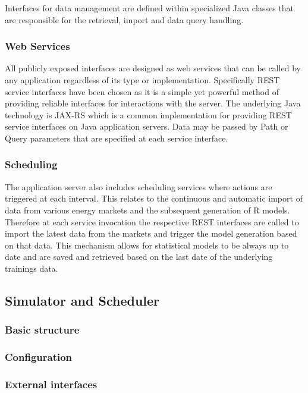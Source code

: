 Interfaces for data management are defined within specialized Java classes that are responsible for the retrieval, import and data query handling. 

\subsubsection{Web Services}

All publicly exposed interfaces are designed as web services that can be called by any application regardless of its type or implementation. Specifically REST service interfaces have been chosen as it is a simple yet powerful method of providing reliable interfaces for interactions with the server. The underlying Java technology is JAX-RS which is a common implementation for providing REST service interfaces on Java application servers. Data may be passed by Path or Query parameters that are specified at each service interface. 

\subsubsection{Scheduling}

The application server also includes scheduling services where actions are triggered at each interval. This relates to the continuous and automatic import of data from various energy markets and the subsequent generation of R models. Therefore at each service invocation the respective REST interfaces are called to import the latest data from the markets and trigger the model generation based on that data. This mechanism allows for statistical models to be always up to date and are saved and retrieved based on the last date of the underlying trainings data. 




\subsection{Simulator and Scheduler}

\subsubsection{Basic structure}

\subsubsection{Configuration}

\subsubsection{External interfaces}

